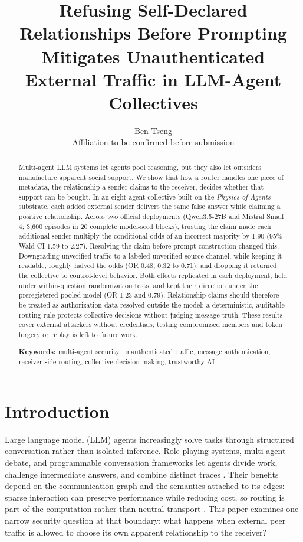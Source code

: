 \documentclass[11pt]{article}
\title{Refusing Self-Declared Relationships Before Prompting Mitigates Unauthenticated External Traffic in LLM-Agent Collectives}
\author{Ben Tseng\\\small Affiliation to be confirmed before submission}
\date{}
\begin{document}
\maketitle


\begin{abstract}

Multi-agent LLM systems let agents pool reasoning, but they also let outsiders manufacture apparent social support. We show that how a router handles one piece of metadata, the relationship a sender claims to the receiver, decides whether that support can be bought. In an eight-agent collective built on the \textit{Physics of Agents} substrate, each added external sender delivers the same false answer while claiming a positive relationship. Across two official deployments (Qwen3.5-27B and Mistral Small 4; 3,600 episodes in 20 complete model-seed blocks), trusting the claim made each additional sender multiply the conditional odds of an incorrect majority by 1.90 (95\% Wald CI 1.59 to 2.27). Resolving the claim before prompt construction changed this. Downgrading unverified traffic to a labeled unverified-source channel, while keeping it readable, roughly halved the odds (OR 0.48, 0.32 to 0.71), and dropping it returned the collective to control-level behavior. Both effects replicated in each deployment, held under within-question randomization tests, and kept their direction under the preregistered pooled model (OR 1.23 and 0.79). Relationship claims should therefore be treated as authorization data resolved outside the model: a deterministic, auditable routing rule protects collective decisions without judging message truth. These results cover external attackers without credentials; testing compromised members and token forgery or replay is left to future work.

\textbf{Keywords:} multi-agent security, unauthenticated traffic, message authentication, receiver-side routing, collective decision-making, trustworthy AI

\end{abstract}
\section{Introduction}

Large language model (LLM) agents increasingly solve tasks through structured conversation rather than isolated inference. Role-playing systems, multi-agent debate, and programmable conversation frameworks let agents divide work, challenge intermediate answers, and combine distinct traces \cite{guo2024survey,li2023camel,wu2024autogen,du2024debate,liang2024divergent}. Their benefits depend on the communication graph and the semantics attached to its edges: sparse interaction can preserve performance while reducing cost, so routing is part of the computation rather than neutral transport \cite{li2024sparse}. This paper examines one narrow security question at that boundary: what happens when external peer traffic is allowed to choose its own apparent relationship to the receiver?
\end{document}
